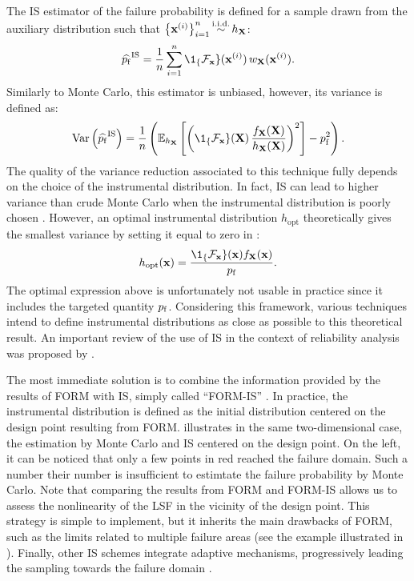 The IS estimator of the failure probability is defined for a sample drawn from the auxiliary distribution such that $\left\{{\bf x}^{(i)}\right\}_{i=1}^n \mathop{\sim}\limits^{\mathrm{i.i.d.}} h_{\bf X}$: 
\begin{equation}
    \what{\pf}^{\mathrm{IS}} = \frac1n \sum_{i=1}^{n} \1_\{\iF_\bx\}(\bx^{(i)}) \, w_\bX(\bx^{(i)}).
    \label{eq:pf_IS}
\end{equation}
Similarly to Monte Carlo, this estimator is unbiased, however, its variance is defined as: 
\begin{equation}
    \var\left( \what{\pf}^{\mathrm{IS}}\right) = \frac1n \left( \E_{h_\bX}\left[\left(\1_\{\iF_\bx\}(\bX) \, \frac{f_\bX(\bX)}{h_\bX(\bX)}\right)^2\right] - \pf^2\right).
    \label{eq:IS_variance}
\end{equation}
The quality of the variance reduction associated to this technique fully depends on the choice of the instrumental distribution. 
In fact, IS can lead to higher variance than crude Monte Carlo when the instrumental distribution is poorly chosen \citep{owen_zhou_2000_is}. 
However, an optimal instrumental distribution $h_{\mathrm{opt}}$ theoretically gives the smallest variance by setting it equal to zero in : 
\begin{equation}
    h_{\mathrm{opt}}(\bx) = \frac{\1_\{\iF_\bx\}(\bx) f_\bX(\bx)}{\pf}. 
\end{equation}
The optimal expression above is unfortunately not usable in practice since it includes the targeted quantity $p_\mathrm{f}$. 
Considering this framework, various techniques intend to define instrumental distributions as close as possible to this theoretical result. 
An important review of the use of IS in the context of reliability analysis was proposed by \citet{tabandeh_2022_IS_review}. 

The most immediate solution is to combine the information provided by the results of FORM with IS, simply called ``FORM-IS'' \citep{melchers_1989_formis}. 
In practice, the instrumental distribution is defined as the initial distribution centered on the design point resulting from FORM. 
 illustrates in the same two-dimensional case, the estimation by Monte Carlo and IS centered on the design point. 
On the left, it can be noticed that only a few points in red reached the failure domain. 
Such a number their number is insufficient to estimtate the failure probability by Monte Carlo.  
Note that comparing the results from FORM and FORM-IS allows us to assess the nonlinearity of the LSF in the vicinity of the design point.  
This strategy is simple to implement, but it inherits the main drawbacks of FORM, such as the limits related to multiple failure areas (see the example illustrated in ). 
Finally, other IS schemes integrate adaptive mechanisms, progressively leading the sampling towards the failure domain \citep{bugallo_2017_AIS_review}.  




